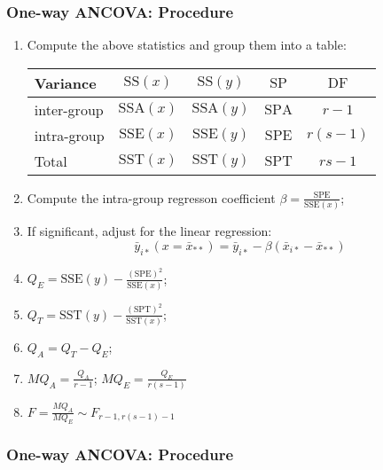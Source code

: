 \documentclass[table,10pt]{beamer}\usepackage[]{graphicx}\usepackage[]{color}
\begin{document}
\begin{CJK*}{UTF8}{gbsn}
\begin{frame}[t]
\frametitle{One-way ANCOVA: Procedure}
\begin{enumerate}[<+->]
	\item Compute the above statistics and group them into a table:
\begin{table}
\footnotesize
\begin{tabular}{l|c|c|c|c}
\hline
Variance & $\textrm{SS}(x)$ & $\textrm{SS}(y)$ & $\textrm{SP}$ & $\textrm{DF}$\\
\hline
inter-group & $\textrm{SSA}(x)$ & $\textrm{SSA}(y)$ & $\textrm{SPA}$ & $r-1$\\
intra-group & $\textrm{SSE}(x)$ & $\textrm{SSE}(y)$ & $\textrm{SPE}$ & $r(s-1)$\\
Total & $\textrm{SST}(x)$ & $\textrm{SST}(y)$ & $\textrm{SPT}$ & $rs-1$\\
\hline
\end{tabular}
\end{table}
	\item Compute the intra-group regresson coefficient $\beta = \frac{\textrm{SPE}}{\textrm{SSE}(x)}$;
	\item If significant, adjust for the linear regression:
	$$
\bar{y}_{i*}(x = \bar{x}_{**}) = \bar{y}_{i*} - \beta(\bar{x}_{i*} - \bar{x}_{**})
	$$
	\item $Q_E = \textrm{SSE}(y) - \frac{(\textrm{SPE})^2}{\textrm{SSE}(x)}$;
	\item $Q_T = \textrm{SST}(y) - \frac{(\textrm{SPT})^2}{\textrm{SST}(x)}$;
	\item $Q_A = Q_T - Q_E$;
	\item $MQ_A = \frac{Q_A}{r-1}$; $MQ_E = \frac{Q_E}{r(s-1)}$
	\item $F=\frac{MQ_A}{MQ_E} \sim F_{r-1, r(s-1)-1}$
\end{enumerate}
\end{frame}


\begin{frame}[t]
\frametitle{One-way ANCOVA: Procedure}


\end{frame}
\end{CJK*}
\end{document}
